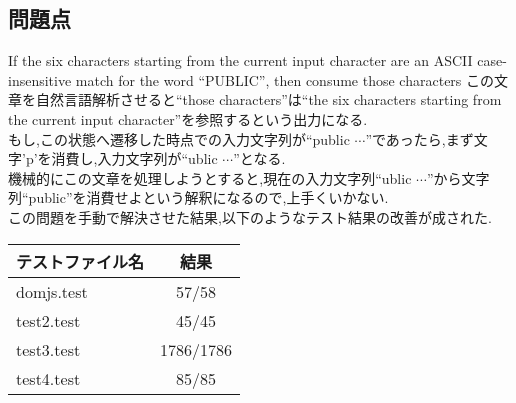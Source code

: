 \documentclass[uplatex,a4j]{jsreport}
\begin{document}
\subsection{問題点}
If the six characters starting from the current input character are an ASCII case-insensitive match for the word ``PUBLIC'', then consume those characters
この文章を自然言語解析させると``those characters''は``the six characters starting from the current input character''を参照するという出力になる.\\
もし,この状態へ遷移した時点での入力文字列が``public $\cdots$''であったら,まず文字'p'を消費し,入力文字列が``ublic $\cdots$''となる.\\
機械的にこの文章を処理しようとすると,現在の入力文字列``ublic $\cdots$''から文字列``public''を消費せよという解釈になるので,上手くいかない.\\
この問題を手動で解決させた結果,以下のようなテスト結果の改善が成された.\\
\begin{table}[htb]
    \begin{tabular}{|l|c|} \hline
      テストファイル名 & 結果 \\ \hline 
      domjs.test & 57/58 \\
      test2.test & 45/45 \\
      test3.test & 1786/1786 \\
      test4.test & 85/85 \\ \hline 
    \end{tabular}
\end{table}







\end{document}
